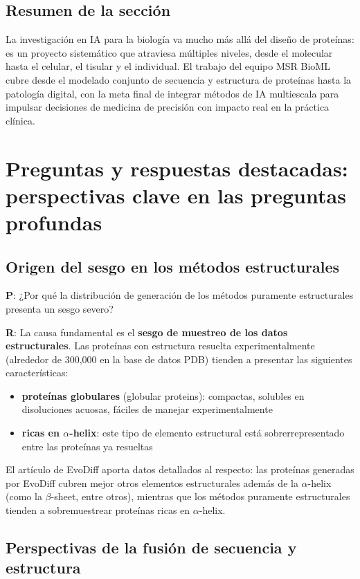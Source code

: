 \documentclass[a4paper]{article}
\begin{document}
\subsection{Resumen de la sección}

La investigación en IA para la biología va mucho más allá del diseño de proteínas: es un proyecto sistemático que atraviesa múltiples niveles, desde el molecular hasta el celular, el tisular y el individual. El trabajo del equipo MSR BioML cubre desde el modelado conjunto de secuencia y estructura de proteínas hasta la patología digital, con la meta final de integrar métodos de IA multiescala para impulsar decisiones de medicina de precisión con impacto real en la práctica clínica.
\section{Preguntas y respuestas destacadas: perspectivas clave en las preguntas profundas}

\subsection{Origen del sesgo en los métodos estructurales}

\textbf{P}: ¿Por qué la distribución de generación de los métodos puramente estructurales presenta un sesgo severo?

\textbf{R}: La causa fundamental es el \textbf{sesgo de muestreo de los datos estructurales}. Las proteínas con estructura resuelta experimentalmente (alrededor de 300,000 en la base de datos PDB) tienden a presentar las siguientes características:
\begin{itemize}
    \item \textbf{proteínas globulares} (globular proteins): compactas, solubles en disoluciones acuosas, fáciles de manejar experimentalmente
    \item \textbf{ricas en $\alpha$-helix}: este tipo de elemento estructural está sobrerrepresentado entre las proteínas ya resueltas
\end{itemize}

El artículo de EvoDiff aporta datos detallados al respecto: las proteínas generadas por EvoDiff cubren mejor otros elementos estructurales además de la $\alpha$-helix (como la $\beta$-sheet, entre otros), mientras que los métodos puramente estructurales tienden a sobremuestrear proteínas ricas en $\alpha$-helix.

\subsection{Perspectivas de la fusión de secuencia y estructura}
\end{document}
